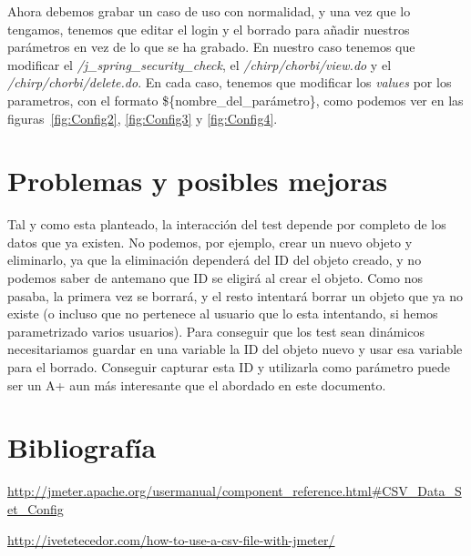 \documentclass[a4paper]{article}
\begin{document}
Ahora debemos grabar un caso de uso con normalidad, y una vez que lo tengamos, tenemos que editar el login y el borrado para añadir nuestros parámetros en vez de lo que se ha grabado. En nuestro caso tenemos que modificar el \textit{/j\_spring\_security\_check}, el \textit{/chirp/chorbi/view.do} y el \textit{/chirp/chorbi/delete.do}. En cada caso, tenemos que modificar los \textit{values} por los parametros, con el formato \$\{nombre\_del\_parámetro\}, como podemos ver en las figuras~\ref{fig:Config2}, \ref{fig:Config3} y \ref{fig:Config4}.

\section{Problemas y posibles mejoras}

Tal y como esta planteado, la interacción del test depende por completo de los datos que ya existen. No podemos, por ejemplo, crear un nuevo objeto y eliminarlo, ya que la eliminación dependerá del ID del objeto creado, y no podemos saber de antemano que ID se eligirá al crear el objeto. Como nos pasaba, la primera vez se borrará, y el resto intentará borrar un objeto que ya no existe (o incluso que no pertenece al usuario que lo esta intentando, si hemos parametrizado varios usuarios). Para conseguir que los test sean dinámicos necesitariamos guardar en una variable la ID del objeto nuevo y usar esa variable para el borrado. Conseguir capturar esta ID y utilizarla como parámetro puede ser un A+ aun más interesante que el abordado en este documento.

\section{Bibliografía}
\url{http://jmeter.apache.org/usermanual/component_reference.html#CSV_Data_Set_Config}

\url{http://ivetetecedor.com/how-to-use-a-csv-file-with-jmeter/}
\end{document}
